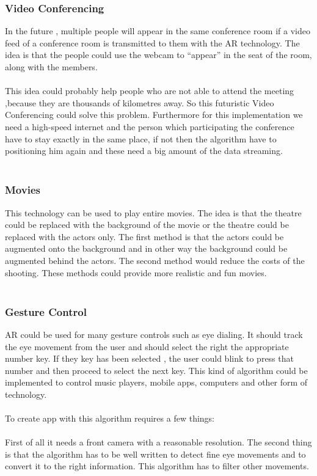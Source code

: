 \subsubsection{Video Conferencing}
In the future , multiple people will appear in the same conference room if a video feed of a conference room is  transmitted to them with the AR technology.  The idea is that the people could use  the webcam to “appear” in the seat of the room, along with the members.
\\
\\
This idea could probably help people who are not able to attend the meeting ,because they are thousands of kilometres away. So this futuristic Video Conferencing could solve this problem. Furthermore for this implementation we need a high-speed internet and the person which participating the conference have to stay  exactly in the same place, if not then the algorithm have to positioning him again and these need a big amount of the data streaming.
\\
\\
\subsubsection{Movies}
This technology can be used  to play entire movies.  The idea is that the theatre could be replaced with the background of the movie  or the theatre could be replaced with the actors only.  The first method is that the actors could be augmented onto the background and in  other way the background could be augmented behind the actors. The second method would reduce the costs of the shooting. These methods could provide more realistic and fun movies.
\\
\\
\subsubsection{Gesture Control}
AR could be used for many gesture controls such as eye dialing.   It should track the eye movement from the user and should select the right the appropriate number key. If they key has been selected , the user could blink to press that number and then proceed to select the next key. This kind of algorithm could be implemented to control music players, mobile apps, computers and other form of technology.
\\
\\
To create app with this algorithm requires a few things:
\\
\\
First of all it needs a front camera with a reasonable resolution. The second thing is that the algorithm has to be well written to detect fine eye movements  and to convert it to the right information. This algorithm has to filter other movements.
\\
\\
